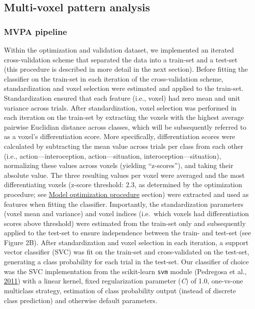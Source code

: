 \documentclass[12pt,american,a4paper,oneside,]{memoir} %
\begin{document}
\hypertarget{shared-states-methods-mvpa}{%
\subsection{Multi-voxel pattern analysis}\label{shared-states-methods-mvpa}}

\hypertarget{shared-states-methods-mvpa-pipeline}{%
\subsubsection{MVPA pipeline}\label{shared-states-methods-mvpa-pipeline}}

Within the optimization and validation dataset, we implemented an iterated cross-validation scheme that separated the data into a train-set and a test-set (this procedure is described in more detail in the next section). Before fitting the classifier on the train-set in each iteration of the cross-validation scheme, standardization and voxel selection were estimated and applied to the train-set. Standardization ensured that each feature (i.e., voxel) had zero mean and unit variance across trials. After standardization, voxel selection was performed in each iteration on the train-set by extracting the voxels with the highest average pairwise Euclidian distance across classes, which will be subsequently referred to as a voxel's differentiation score. More specifically, differentiation scores were calculated by subtracting the mean value across trials per class from each other (i.e., action---interoception, action---situation, interoception---situation), normalizing these values across voxels (yielding ``z-scores''), and taking their absolute value. The three resulting values per voxel were averaged and the most differentiating voxels (z-score threshold: 2.3, as determined by the optimization procedure; see \protect\hyperlink{shared-states-methods-model-optimization-procedure}{Model optimization procedure} section) were extracted and used as features when fitting the classifier. Importantly, the standardization parameters (voxel mean and variance) and voxel indices (i.e.~which voxels had differentiation scores above threshold) were estimated from the train-set only and subsequently applied to the test-set to ensure independence between the train- and test-set (see Figure 2B). After standardization and voxel selection in each iteration, a support vector classifier (SVC) was fit on the train-set and cross-validated on the test-set, generating a class probability for each trial in the test-set. Our classifier of choice was the SVC implementation from the scikit-learn \texttt{svm} module (Pedregosa et al., \protect\hyperlink{ref-pedregosa2011scikit}{2011}) with a linear kernel, fixed regularization parameter (\emph{C}) of 1.0, one-vs-one multiclass strategy, estimation of class probability output (instead of discrete class prediction) and otherwise default parameters.
\end{document}
